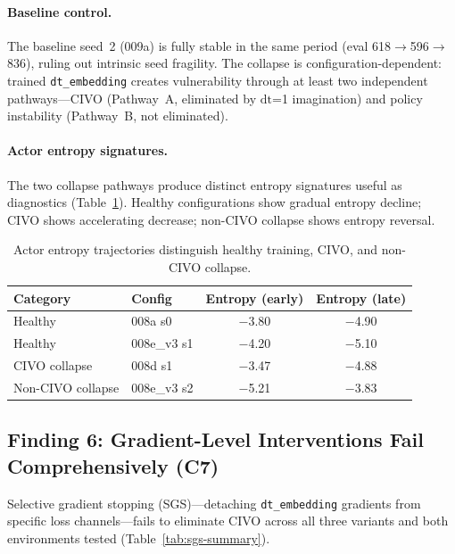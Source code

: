 \documentclass{article}
\newcommand{\dt}{\mathrm{dt}}
\begin{document}
\paragraph{Baseline control.}
The baseline seed~2 (009a) is fully stable in the same period (eval 618$\to$596$\to$836), ruling out intrinsic seed fragility.
The collapse is configuration-dependent: trained \texttt{dt\_embedding} creates vulnerability through at least two independent pathways---CIVO (Pathway~A, eliminated by $\dt$=1 imagination) and policy instability (Pathway~B, not eliminated).

\paragraph{Actor entropy signatures.}
The two collapse pathways produce distinct entropy signatures useful as diagnostics (Table~\ref{tab:entropy}).
Healthy configurations show gradual entropy decline; CIVO shows accelerating decrease; non-CIVO collapse shows entropy reversal.

\begin{table}[h]
\centering
\caption{Actor entropy trajectories distinguish healthy training, CIVO, and non-CIVO collapse.}
\label{tab:entropy}
\begin{tabular}{llcc}
\toprule
\textbf{Category} & \textbf{Config} & \textbf{Entropy (early)} & \textbf{Entropy (late)} \\
\midrule
Healthy & 008a s0 & $-$3.80 & $-$4.90 \\
Healthy & 008e\_v3 s1 & $-$4.20 & $-$5.10 \\
CIVO collapse & 008d s1 & $-$3.47 & $-$4.88 \\
Non-CIVO collapse & 008e\_v3 s2 & $-$5.21 & $-$3.83 \\
\bottomrule
\end{tabular}
\end{table}

\subsection{Finding 6: Gradient-Level Interventions Fail Comprehensively (C7)}
\label{sec:c7}

Selective gradient stopping (SGS)---detaching \texttt{dt\_embedding} gradients from specific loss channels---fails to eliminate CIVO across all three variants and both environments tested (Table~\ref{tab:sgs-summary}).
\end{document}

